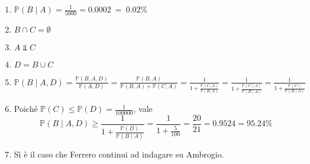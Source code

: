 \begin{enumerate}
\item $\mathbb{P}( B\mid A) =\frac{1}{5000} =0.0002\ =\ 0.02\%$
\item $B\cap C=\emptyset $
\item $A\Bot C$
\item $D=B\cup C$
\item $\mathbb{P}( B\mid A,D) =\frac{\mathbb{P}( B,A,D)}{\mathbb{P}( A,D)} =\frac{\mathbb{P}( B,A)}{\mathbb{P}( B,A) +\mathbb{P}( C,A)} =\frac{1}{1+\frac{\mathbb{P}( C,A)}{\mathbb{P}( B,A)}} =\frac{1}{1+\frac{\mathbb{P}( C\mid A)}{\mathbb{P}( B\mid A)}} =\frac{1}{1+\frac{\mathbb{P}( C)}{\mathbb{P}( B\mid A)}}$
\item Poiché $\mathbb{P}( C) \leq \mathbb{P}( D) =\frac{1}{100000}$, vale\begin{equation*}
\mathbb{P}( B\mid A,D) \geq \frac{1}{1+\frac{\mathbb{P}( D)}{\mathbb{P}( B\mid A)}} =\frac{1}{1+\frac{5}{100}} =\frac{20}{21} =0.9524=95.24\%
\end{equation*}
\item Sì è il caso che Ferrero continui ad indagare su Ambrogio.
\end{enumerate}
\Soluzione


